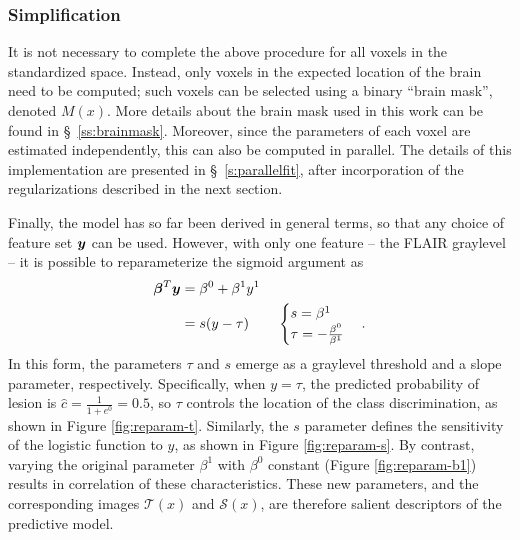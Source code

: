 \subsubsection{Simplification}\label{ss:meth-simple}
It is not necessary to complete the above procedure for all voxels in the standardized space.
Instead, only voxels in the expected location of the brain need to be computed; such voxels can be selected using a binary ``brain mask'', denoted $M(x)$.
More details about the brain mask used in this work can be found in \S\ \ref{ss:brainmask}.
Moreover, since the parameters of each voxel are estimated independently, this can also be computed in parallel.
The details of this implementation are presented in \S\ \ref{s:parallelfit}, after incorporation of the regularizations described in the next section.
\par
Finally, the model has so far been derived in general terms, so that any choice of feature set $\bm{y}$ can be used.
However, with only one feature -- the FLAIR graylevel -- it is possible to reparameterize the sigmoid argument as
\begin{align}
\bm{\beta}^T\bm{y} &= \beta^0 + \beta^1 y^1\nonumber\\
&= s(y-\tau) \qquad\begin{cases} s = \beta^1\\ \tau = -\frac{\beta^0}{\beta^1} \end{cases}.
\label{eq:reparameterize}
\end{align}
In this form, the parameters $\tau$ and $s$ emerge as a graylevel threshold and a slope parameter, respectively.
Specifically, when $y = \tau$, the predicted probability of lesion is $\hat{c} = \tfrac{1}{1+e^{0}} = 0.5$, so $\tau$ controls the location of the class discrimination, as shown in Figure \ref{fig:reparam-t}.
Similarly, the $s$ parameter defines the sensitivity of the logistic function to $y$, as shown in Figure \ref{fig:reparam-s}.
By contrast, varying the original parameter $\beta^1$ with $\beta^0$ constant (Figure \ref{fig:reparam-b1}) results in correlation of these characteristics.
These new parameters, and the corresponding images $\mathcal{T}(x)$ and $\mathcal{S}(x)$, are therefore salient descriptors of the predictive model.
